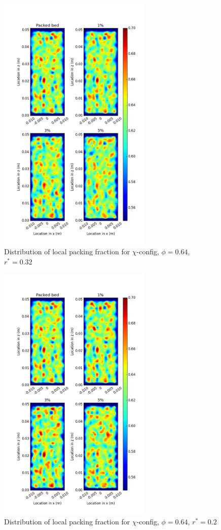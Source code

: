 \begin{figure}[!t]
    \centering
    \includegraphics[width = 0.65\textwidth]{figures/x-62-r23-1.png}
    \caption{Distribution of local packing fraction for $\chi$-config, $\phi = 0.64$, $r^* = 0.32$}\label{fig:x-624-r23}
\end{figure}
\begin{figure}[!t]
    \centering
    \includegraphics[width = 0.65\textwidth]{figures/x-62-r125-1.png}
    \caption{Distribution of local packing fraction for $\chi$-config, $\phi = 0.64$, $r^* = 0.2$}\label{fig:x-624r125}
\end{figure}


